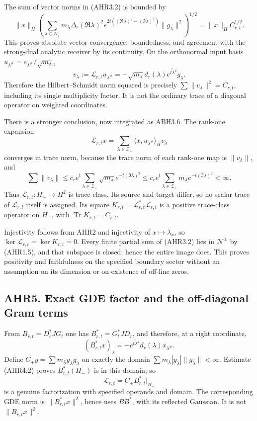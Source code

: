 The sum of vector norms in (AHR3.2) is bounded by \[
\|x\|_H\left(\sum_{\lambda\in\mathscr Z_+}
m_\lambda\Delta_r(\Re\lambda)^2
e^{2t((\Re\lambda)^2-(\Im\lambda)^2)}\|g_\lambda\|^2\right)^{1/2}
=\|x\|_H C_{r,t}^{1/2}.
\tag{AHR4.2}
\] This proves absolute vector convergence, boundedness, and agreement
with the strong-dual analytic receiver by its continuity. On the
orthonormal input basis
\(u_{\lambda^\#}=e_{\lambda^\#}/\sqrt{m_\lambda}\), \[
v_\lambda:=\mathcal L_{r,t}u_{\lambda^\#}
=-\sqrt{m_\lambda}d_r(\lambda)\overline{e^{t\lambda^2}}g_\lambda.
\tag{AHR4.3}
\] Therefore the Hilbert--Schmidt norm squared is precisely
\(\sum\|v_\lambda\|^2=C_{r,t}\), including its single multiplicity
factor. It is not the ordinary trace of a diagonal operator on weighted
coordinates.

There is a stronger conclusion, now integrated as ABH3.6. The rank-one
expansion \[
\mathcal L_{r,t}x=\sum_{\lambda\in\mathscr Z_+}
\langle x,u_{\lambda^\#}\rangle_Hv_\lambda
\tag{AHR4.4}
\] converges in trace norm, because the trace norm of each rank-one map
is \(\|v_\lambda\|\), and \[
\sum\|v_\lambda\|
\le c_re^t\sum_{\lambda\in\mathscr Z_+}\sqrt{m_\lambda}e^{-t(\Im\lambda)^2}
\le c_re^t\sum_{\lambda\in\mathscr Z_+}m_\lambda e^{-t(\Im\lambda)^2}<\infty.
\tag{AHR4.5}
\] Thus \(\mathcal L_{r,t}:H_-\to H^2\) is trace class. Its source and
target differ, so no scalar trace of \(\mathcal L_{r,t}\) itself is
assigned. Its square \(K_{r,t}=\mathcal L_{r,t}^*\mathcal L_{r,t}\) is a
positive trace-class operator on \(H_-\), with
\(\operatorname{Tr}K_{r,t}=C_{r,t}\).

Injectivity follows from AHR2 and injectivity of \(x\mapsto\lambda_x\),
so \(\ker\mathcal L_{r,t}=\ker K_{r,t}=0\). Every finite partial sum of
(AHR3.2) lies in \(\mathcal N^\perp\) by (AHR1.5), and that subspace is
closed; hence the entire image does. This proves positivity and
faithfulness on the specified boundary sector without an assumption on
its dimension or on existence of off-line zeros.

\subsection{AHR5. Exact GDE factor and the off-diagonal Gram
terms}\label{ahr5.-exact-gde-factor-and-the-off-diagonal-gram-terms}

From \(B_{r,t}=D_r^*JG_t\) one has \(B_{r,t}^*=G_t^*JD_r\), and
therefore, at a right coordinate, \[
(B_{r,t}^*x)_\lambda=-\overline{e^{t\lambda^2}}d_r(\lambda)x_{\lambda^\#}.
\tag{AHR5.1}
\] Define \(C_+y=\sum m_\lambda y_\lambda g_\lambda\) on exactly the
domain \(\sum m_\lambda|y_\lambda|\|g_\lambda\|<\infty\). Estimate
(AHR4.2) proves \(B_{r,t}^*(H_-)\) is in this domain, so \[
\mathcal L_{r,t}=C_+B_{r,t}^*|_{H_-}
\tag{AHR5.2}
\] is a genuine factorization with specified operands and domain. The
corresponding GDE norm is \(\|B_{r,t}^*x\|^2\), hence uses \(BB^*\),
with its reflected Gaussian. It is not \(\|B_{r,t}x\|^2\).

